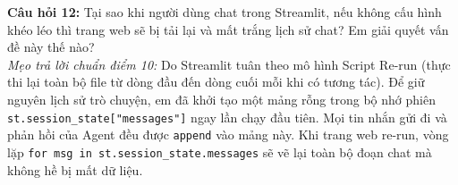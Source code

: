 \begin{checkpointbox}
\textbf{Câu hỏi 12:} Tại sao khi người dùng chat trong Streamlit, nếu không cấu hình khéo léo thì trang web sẽ bị tải lại và mất trắng lịch sử chat? Em giải quyết vấn đề này thế nào?\\
\textit{Mẹo trả lời chuẩn điểm 10:} Do Streamlit tuân theo mô hình Script Re-run (thực thi lại toàn bộ file từ dòng đầu đến dòng cuối mỗi khi có tương tác). Để giữ nguyên lịch sử trò chuyện, em đã khởi tạo một mảng rỗng trong bộ nhớ phiên \texttt{st.session\_state["messages"]} ngay lần chạy đầu tiên. Mọi tin nhắn gửi đi và phản hồi của Agent đều được \texttt{append} vào mảng này. Khi trang web re-run, vòng lặp \texttt{for msg in st.session\_state.messages} sẽ vẽ lại toàn bộ đoạn chat mà không hề bị mất dữ liệu.
\end{checkpointbox}

